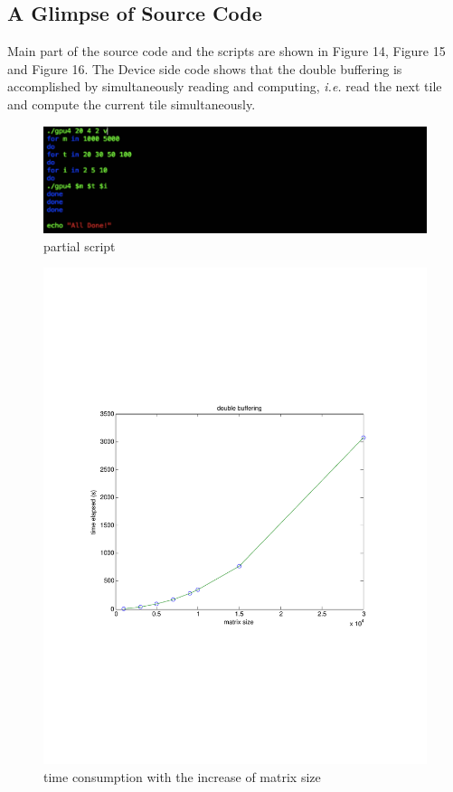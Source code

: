 \documentclass {article}
\begin{document}
\subsection{A Glimpse of Source Code}
Main part of the source code and the scripts are shown in Figure 14, Figure 15 and Figure 16. The Device side code shows that the double buffering is accomplished by simultaneously reading and computing, \textit{i.e.} read the next tile and compute the current tile simultaneously.

\begin{figure}[htp!]
\centering
\includegraphics[width = \linewidth]{gpu43.pdf}
\caption{partial script}
\label{fig:gpu43}
\end{figure}

\begin{figure}[htp!]
\centering
\includegraphics[width = \linewidth]{r_gpu41.pdf}
\caption{time consumption with the increase of matrix size}
\label{fig:rgpu4}
\end{figure}
\end{document}
